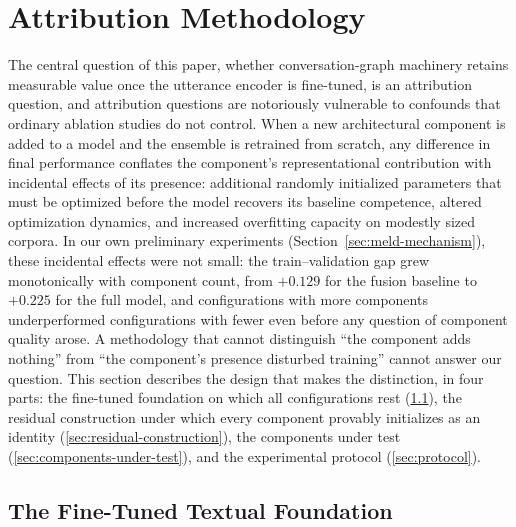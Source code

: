 \section{Attribution Methodology}
\label{sec:methodology}

The central question of this paper, whether conversation-graph machinery retains measurable value once the utterance encoder is fine-tuned, is an attribution question, and attribution questions are notoriously vulnerable to confounds that ordinary ablation studies do not control. When a new architectural component is added to a model and the ensemble is retrained from scratch, any difference in final performance conflates the component's representational contribution with incidental effects of its presence: additional randomly initialized parameters that must be optimized before the model recovers its baseline competence, altered optimization dynamics, and increased overfitting capacity on modestly sized corpora. In our own preliminary experiments (Section~\ref{sec:meld-mechanism}), these incidental effects were not small: the train--validation gap grew monotonically with component count, from $+0.129$ for the fusion baseline to $+0.225$ for the full model, and configurations with more components underperformed configurations with fewer even before any question of component quality arose. A methodology that cannot distinguish ``the component adds nothing'' from ``the component's presence disturbed training'' cannot answer our question. This section describes the design that makes the distinction, in four parts: the fine-tuned foundation on which all configurations rest (\ref{sec:meld-foundation}), the residual construction under which every component provably initializes as an identity (\ref{sec:residual-construction}), the components under test (\ref{sec:components-under-test}), and the experimental protocol (\ref{sec:protocol}).

\subsection{The Fine-Tuned Textual Foundation}
\label{sec:meld-foundation}

